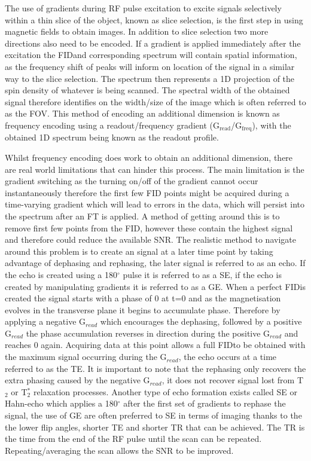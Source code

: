 The use of gradients during \ac{RF} pulse excitation to excite signals selectively within a thin slice of the object, known as slice selection, is the first step in using magnetic fields to obtain images. In addition to slice selection two more directions also need to be encoded. If a gradient is applied immediately after the excitation the \ac{FID}and corresponding spectrum will contain spatial information, as the frequency shift of peaks will inform on location of the signal in a similar way to the slice selection. The spectrum then represents a 1D projection of the spin density of whatever is being scanned. The spectral width of the obtained signal therefore identifies on the width/size of the image which is often referred to as the \ac{FOV}. This method of encoding an additional dimension is known as frequency encoding using a readout/frequency gradient (G$_{\textrm{read}}$/G$_{\textrm{freq}}$), with the obtained 1D spectrum being known as the readout profile.

Whilst frequency encoding does work to obtain an additional dimension, there are real world limitations that can hinder this process. The main limitation is the gradient switching as the turning on/off of the gradient cannot occur instantaneously therefore the first few \ac{FID} points might be acquired during a time-varying gradient which will lead to errors in the data, which will persist into the spectrum after an \ac{FT} is applied. A method of getting around this is to remove first few points from the \ac{FID}, however these contain the highest signal and therefore could reduce the available \ac{SNR}. The realistic method to navigate around this problem is to create an signal at a later time point by taking advantage of dephasing and rephasing, the later signal is referred to as an echo. If the echo is created using a 180$^\circ$ pulse it is referred to as a \ac{SE}, if the echo is created by manipulating gradients it is referred to as a \ac{GE}. When a perfect \ac{FID}is created the signal starts with a phase of 0 at t=0 and as the magnetisation evolves in the transverse plane it begins to accumulate phase. Therefore by applying a negative G$_{read}$ which encourages the dephasing, followed by a positive G$_{read}$ the phase accumulation reverses in direction during the positive G$_{read}$ and reaches 0 again. Acquiring data at this point allows a full \ac{FID}to be obtained with the maximum signal occurring during the G$_{read}$, the echo occurs at a time referred to as the \ac{TE}. It is important to note that the rephasing only recovers the extra phasing caused by the negative G$_{read}$, it does not recover signal lost from T$_2$ or T$_2^*$ relaxation processes. Another type of echo formation exists called \ac{SE} or Hahn-echo \cite{Hahn1950SpinEchoes} which applies a 180$^\circ$ after the first set of gradients to rephase the signal, the use of \ac{GE} are often preferred to SE in terms of imaging thanks to the the lower flip angles, shorter \ac{TE} and shorter \ac{TR} that can be achieved. The \ac{TR} is the time from the end of the \ac{RF} pulse until the scan can be repeated. Repeating/averaging the scan allows the \ac{SNR} to be improved.

